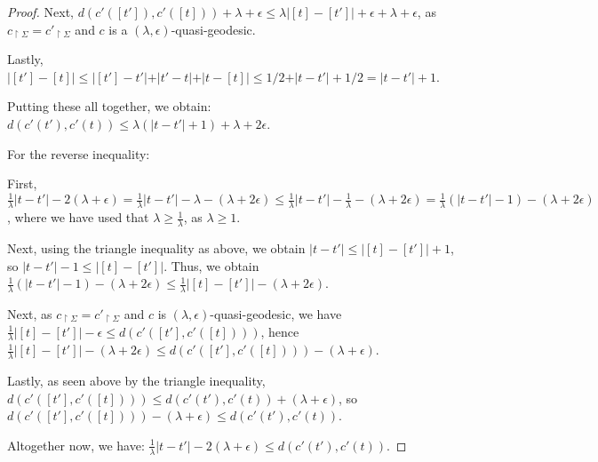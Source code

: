 \documentclass[12pt]{article}
\newcommand{\vs}{\vskip10pt}
\begin{document}
\begin{proof}
		\vs 
		
		Next, $d(c'([t']), c'([t])) + \lambda + \epsilon \leq \lambda \vert [t] - [t'] \vert + \epsilon + \lambda + \epsilon$, as $c_{\restriction \Sigma} = c'_{\restriction \Sigma}$ and $c$ is a $(\lambda, \epsilon)$-quasi-geodesic. 
		
		\vs 
		
		Lastly, $\vert [t'] - [t] \vert \leq \vert [t'] - t' \vert + \vert t' - t \vert + \vert t - [t] \vert \leq 1/2 + \vert t - t' \vert + 1/2 = \vert t - t' \vert + 1$. 
		
		\vs 
		
		Putting these all together, we obtain: $d(c'(t'), c'(t)) \leq \lambda (\vert t - t' \vert + 1) + \lambda + 2 \epsilon$. 
		
		\vs
 		
 		For the reverse inequality: 
 		
		\vs 
		
		First, $\frac{1}{\lambda} \vert t - t' \vert - 2(\lambda + \epsilon) = \frac{1}{\lambda} \vert t - t' \vert - \lambda - (\lambda + 2 \epsilon) \leq \frac{1}{\lambda} \vert t - t' \vert - \frac{1}{\lambda} - (\lambda + 2 \epsilon) = \frac{1}{\lambda} (\vert t - t' \vert - 1) - (\lambda + 2 \epsilon)$, where we have used that $\lambda \geq \frac{1}{\lambda}$, as $\lambda \geq 1$. 
		
		\vs 
		
		Next, using the triangle inequality as above, we obtain $\vert t - t' \vert \leq \vert [t] - [t'] \vert + 1$, so $\vert t - t' \vert - 1 \leq \vert [t] - [t'] \vert$. Thus, we obtain $\frac{1}{\lambda} (\vert t - t' \vert - 1) - (\lambda + 2 \epsilon) \leq \frac{1}{\lambda} \vert [t] - [t'] \vert - (\lambda + 2 \epsilon)$. 
		
		\vs 
		
		Next, as $c_{\restriction \Sigma} = c'_{\restriction \Sigma}$ and $c$ is $(\lambda, \epsilon)$-quasi-geodesic, we have $\frac{1}{\lambda} \vert [t] - [t'] \vert - \epsilon \leq d(c'([t'], c'([t])))$, hence $\frac{1}{\lambda} \vert [t] - [t'] \vert - (\lambda + 2 \epsilon) \leq d(c'([t'], c'([t]))) - (\lambda + \epsilon)$. 
		
		\vs 
		
		Lastly, as seen above by the triangle inequality, $d(c'([t'], c'([t]))) \leq d(c'(t'), c'(t)) + (\lambda + \epsilon)$, so $d(c'([t'], c'([t]))) - (\lambda + \epsilon) \leq d(c'(t'), c'(t))$. 
		
		\vs 
		
		Altogether now, we have: $\frac{1}{\lambda} \vert t - t' \vert - 2(\lambda + \epsilon) \leq d(c'(t'), c'(t))$. 


\end{proof}
\end{document}

